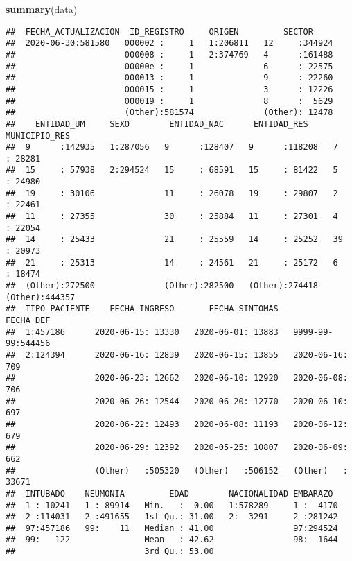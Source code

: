 \documentclass[]{article}
\newenvironment{Shaded}{\begin{snugshade}}{\end{snugshade}}
\newcommand{\KeywordTok}[1]{\textcolor[rgb]{0.13,0.29,0.53}{\textbf{#1}}}
\newcommand{\NormalTok}[1]{#1}
\begin{document}
\begin{Shaded}
\begin{Highlighting}[]
\KeywordTok{summary}\NormalTok{(data)}
\end{Highlighting}
\end{Shaded}

\begin{verbatim}
##  FECHA_ACTUALIZACION  ID_REGISTRO     ORIGEN         SECTOR      
##  2020-06-30:581580   000002 :     1   1:206811   12     :344924  
##                      000008 :     1   2:374769   4      :161488  
##                      00000e :     1              6      : 22575  
##                      000013 :     1              9      : 22260  
##                      000015 :     1              3      : 12226  
##                      000019 :     1              8      :  5629  
##                      (Other):581574              (Other): 12478  
##    ENTIDAD_UM     SEXO        ENTIDAD_NAC      ENTIDAD_RES     MUNICIPIO_RES   
##  9      :142935   1:287056   9      :128407   9      :118208   7      : 28281  
##  15     : 57938   2:294524   15     : 68591   15     : 81422   5      : 24980  
##  19     : 30106              11     : 26078   19     : 29807   2      : 22461  
##  11     : 27355              30     : 25884   11     : 27301   4      : 22054  
##  14     : 25433              21     : 25559   14     : 25252   39     : 20973  
##  21     : 25313              14     : 24561   21     : 25172   6      : 18474  
##  (Other):272500              (Other):282500   (Other):274418   (Other):444357  
##  TIPO_PACIENTE    FECHA_INGRESO       FECHA_SINTOMAS        FECHA_DEF     
##  1:457186      2020-06-15: 13330   2020-06-01: 13883   9999-99-99:544456  
##  2:124394      2020-06-16: 12839   2020-06-15: 13855   2020-06-16:   709  
##                2020-06-23: 12662   2020-06-10: 12920   2020-06-08:   706  
##                2020-06-26: 12544   2020-06-20: 12770   2020-06-10:   697  
##                2020-06-22: 12493   2020-06-08: 11193   2020-06-12:   679  
##                2020-06-29: 12392   2020-05-25: 10807   2020-06-09:   662  
##                (Other)   :505320   (Other)   :506152   (Other)   : 33671  
##  INTUBADO    NEUMONIA         EDAD        NACIONALIDAD EMBARAZO   
##  1 : 10241   1 : 89914   Min.   :  0.00   1:578289     1 :  4170  
##  2 :114031   2 :491655   1st Qu.: 31.00   2:  3291     2 :281242  
##  97:457186   99:    11   Median : 41.00                97:294524  
##  99:   122               Mean   : 42.62                98:  1644  
##                          3rd Qu.: 53.00                           

\end{verbatim}
\end{document}
